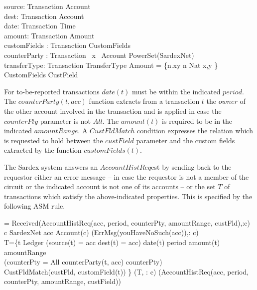 \begin{asm}
source: Transaction \rightarrow Account \\
dest: Transaction \rightarrow Account\\
date: Transaction \rightarrow Time\\
amount: Transaction \rightarrow Amount \\
customFields : Transaction \rightarrow CustomFields \\
counterParty : Transaction ~x~ Account \rightarrow PowerSet(SardexNet) \\
transferType: Transaction \rightarrow TransferType\+
\WHERE \+
Amount = \{n.xy \mid n \in Nat  \leq x,y \}\\
CustomFields \subseteq CustField
\end{asm}


For to-be-reported transactions $date(t)$ must be within the indicated $period$.  The $counterParty(t, acc)$ function extracts from a transaction $t$ the $owner$ of the other account involved in the transaction and is applied in case the $counterPty$ parameter is not $All$.  The $amount(t)$  is required to be in the indicated $amountRange$. A $CustFldMatch$ condition expresses the relation which is requested to hold between the $custField$ parameter and the custom fields extracted by the function $customFields(t)$. 



The Sardex system answers an $AccountHistReq$est by sending back to the requestor 
either an error message -- in case the requestor is not a member of the circuit or 
the indicated account is not one of its accounts -- or the set $T$ of transactions 
which satisfy the above-indicated properties. This is specified by the following ASM rule.

\begin{asm}
=\+
   \IF Received(AccountHistReq(acc, period, counterPty, amountRange, custFld),\FROM :c)    \THEN \+
     \IF c \not \in SardexNet \OR acc \not\in Account(c) \+
       \THEN {}(ErrMsg(youHaveNoSuch(acc)),\TO : c)\\
       \ELSE \+
       \LET T=\{t \in Ledger \mid (source(t) = acc \OR dest(t) = acc) \+
           \AND date(t) \in period \AND amount(t) \in amountRange \\
           \AND (\IF counterPty \not = All \THEN 
               counterParty(t, acc) \in  counterPty)\\
           \AND CustFldMatch(custFld, customField(t)) \} \IN \+
                 (T, \TO : c)\dec\dec\dec\-
     (AccountHistReq(acc, period, counterPty, amountRange, custField))
\end{asm}

